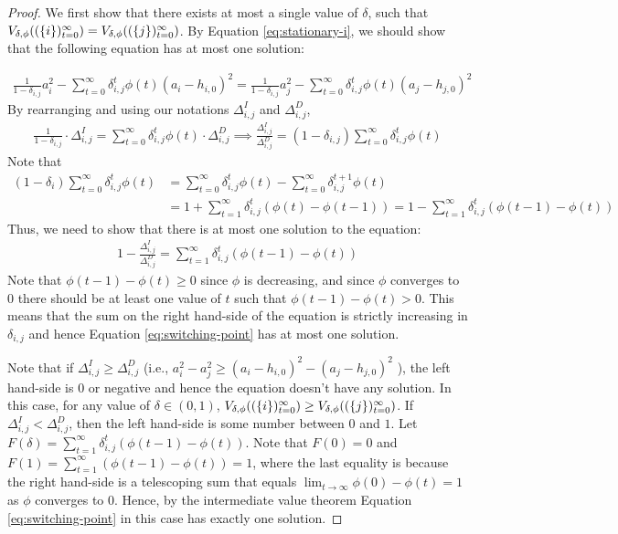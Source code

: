 \begin{proof}
We first show that there exists at most a single value of $\delta$, such that $V_{\delta,\phi}((\{i\})_{t=0}^\infty) = V_{\delta,\phi}((\{j\})_{t=0}^\infty)$. By Equation \eqref{eq:stationary-i}, we should show that the following equation has at most one solution:

\begin{align*}
    \frac{1}{1-\delta_{i,j}} a_i^2 - \sum_{t=0}^\infty \delta_{i,j}^t \phi(t) (a_i-h_{i,0})^2 = \frac{1}{1-\delta_{i,j}} a_j^2 - \sum_{t=0}^\infty \delta_{i,j}^t \phi(t) (a_j-h_{j,0})^2
\end{align*}
By rearranging and %
using our notations $\Delta^I_{i,j}$ and $\Delta^D_{i,j}$, 
\begin{align*}
\frac{1}{1-\delta_{i,j}} \cdot \Delta^I_{i,j} =  \sum_{t=0}^\infty \delta_{i,j}^t \phi(t) \cdot \Delta^D_{i,j} \implies   \frac{\Delta^I_{i,j}}{\Delta^D_{i,j}} = (1-\delta_{i,j})\sum_{t=0}^\infty \delta_{i,j}^t \phi(t)
\end{align*}
Note that 
\begin{align*}
    (1-\delta_i)\sum_{t=0}^\infty \delta_{i,j}^t \phi(t) &= \sum_{t=0}^\infty \delta_{i,j}^t \phi(t) -\sum_{t=0}^\infty \delta_{i,j}^{t+1} \phi(t) \\
    &=1+\sum_{t=1}^\infty \delta_{i,j}^t( \phi(t)-\phi(t-1)) 
    =1-\sum_{t=1}^\infty \delta_{i,j}^t (\phi(t-1)-\phi(t)) 
\end{align*}
Thus, we need to show that there is at most one solution to the equation:
\begin{align} \label{eq:switching-point}
   1- \frac{\Delta^I_{i,j}}{\Delta^D_{i,j}} = \sum_{t=1}^\infty \delta_{i,j}^t (\phi(t-1)-\phi(t))
\end{align}
Note that $\phi(t-1)-\phi(t) \geq 0$ since $\phi$ is decreasing, and since $\phi$ converges to $0$ there should be at least one value of $t$ such that $\phi(t-1)-\phi(t) > 0$. This means that the sum on the right hand-side of the equation is strictly increasing in $\delta_{i,j}$ and hence Equation \eqref{eq:switching-point} has at most one solution. 

Note that if $\Delta^I_{i,j} \geq \Delta^D_{i,j}$ (i.e., $  a_i^2 - a_j^2 \geq (a_i-h_{i,0})^2 - (a_j-h_{j,0})^2 $ ), the left hand-side is $0$ or negative and hence the equation doesn't have any solution. In this case, for any value of $\delta \in (0,1)$, $V_{\delta,\phi}((\{i\})_{t=0}^\infty) \geq V_{\delta,\phi}((\{j\})_{t=0}^\infty)$. If $\Delta^I_{i,j}<\Delta^D_{i,j}$, then the left hand-side is some number between $0$ and $1$. Let $F(\delta) = \sum_{t=1}^\infty \delta_{i,j}^t (\phi(t-1)-\phi(t))$. Note that $F(0) = 0$ and $F(1) = \sum_{t=1}^\infty (\phi(t-1)-\phi(t)) = 1$, where the last equality is because the right hand-side is a telescoping sum that equals $\lim_{t \rightarrow \infty} \phi(0)-\phi(t) = 1$ as $\phi$ converges to $0$. Hence, by the intermediate value theorem Equation \eqref{eq:switching-point} in this case has exactly one solution. 
\end{proof}

